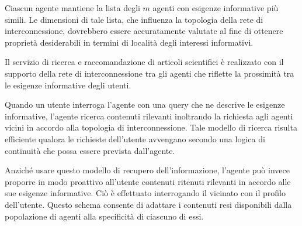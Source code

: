 Ciascun agente mantiene la lista degli $m$ agenti con esigenze informative più simili. Le dimensioni di tale lista, che influenza la topologia della rete di interconnessione, dovrebbero essere accuratamente valutate al fine di ottenere proprietà desiderabili in termini di località degli interessi informativi.

Il servizio di ricerca e raccomandazione di articoli scientifici è realizzato con il supporto della rete di interconnessione tra gli agenti che riflette la prossimità tra le esigenze informative degli utenti.

Quando un utente interroga l'agente con una query che ne descrive le esigenze informative, l'agente ricerca contenuti rilevanti inoltrando la richiesta agli agenti vicini in accordo alla topologia di interconnessione. Tale modello di ricerca risulta efficiente qualora le richieste dell'utente avvengano secondo una logica di continuità che possa essere prevista dall'agente.

Anziché usare questo modello di recupero dell'informazione, l'agente può invece proporre in modo proattivo all'utente contenuti ritenuti rilevanti in accordo alle sue esigenze informative. Ciò è effettuato interrogando il vicinato con il profilo dell'utente. Questo schema consente di adattare i contenuti resi disponibili dalla popolazione di agenti alla specificità di ciascuno di essi.

